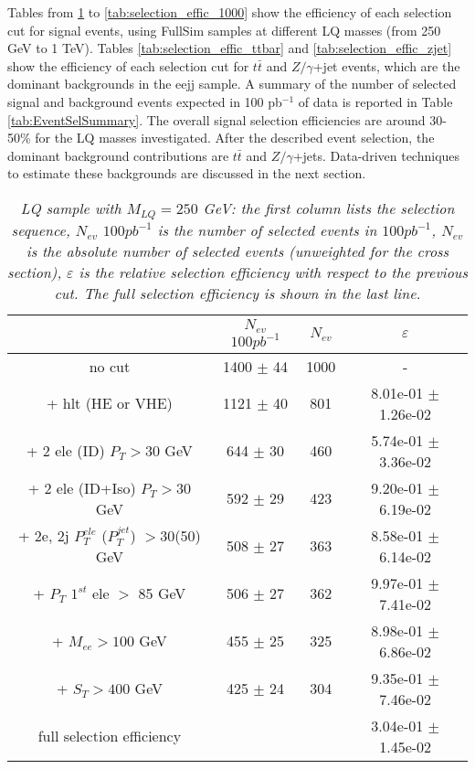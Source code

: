 \documentclass[colclass=cmspaper]{combine}
\begin{document}
\begin{linenumbers}
Tables from \ref{tab:selection_effic_250} to \ref{tab:selection_effic_1000} show the efficiency 
of each selection cut for signal events, using FullSim samples at different LQ masses (from 250 GeV to 1 TeV).
Tables \ref{tab:selection_effic_ttbar} and \ref{tab:selection_effic_zjet} show the efficiency of each selection cut 
for $t\bar{t}$ and $Z/\gamma$+jet events, which are the dominant backgrounds in the eejj sample. 
A summary of the number of selected signal and background events expected in 100 pb$^{-1}$ of data 
is reported in Table \ref{tab:EventSelSummary}. 
The overall signal selection efficiencies are around 30-50\% for the LQ masses investigated. 
After the described event selection, the dominant background contributions 
are $t\bar{t}$ and $Z/\gamma$+jets. Data-driven techniques to estimate these backgrounds
are discussed in the next section.


\begin{table}[htbp]
\begin{center}
\begin{tabular}{|c|c|c|c|}
\hline
\hline
 & $N_{ev}$ $100pb^{-1}$ & $N_{ev}$ & $\varepsilon$ \\
\hline
\hline

no cut &1400 $\pm$ 44& 1000 & - \\
+ hlt (HE or VHE) &1121 $\pm$ 40 & 801 & 8.01e-01 $\pm$ 1.26e-02\\
+ 2 ele (ID) $P_{T} >30$ GeV &644 $\pm$ 30 & 460 & 5.74e-01 $\pm$ 3.36e-02\\
+ 2 ele (ID+Iso) $P_{T} >30$ GeV &592 $\pm$ 29 & 423 & 9.20e-01 $\pm$ 6.19e-02\\
+ 2e, 2j $P_{T}^{ele}$ ($P_{T}^{jet}$) $>$30(50) GeV &508 $\pm$ 27& 363 & 8.58e-01 $\pm$ 6.14e-02\\
+ $P_{T}$ $1^{st}$ ele $>$ 85 GeV &506 $\pm$ 27& 362 & 9.97e-01 $\pm$ 7.41e-02\\
+ $M_{ee} >100$ GeV& 455 $\pm$ 25& 325 & 8.98e-01 $\pm$ 6.86e-02\\
+ $S_{T} >400$ GeV &425 $\pm$ 24& 304 & 9.35e-01 $\pm$ 7.46e-02\\
\hline

full selection efficiency& &  & 3.04e-01 $\pm$ 1.45e-02\\
\hline
\end{tabular}
\end{center}
\caption{\small \sl LQ sample with $M_{LQ}=250$ GeV: the first column lists the selection sequence, $N_{ev}$ $100pb^{-1}$ is the number of selected events in $100pb^{-1}$, $N_{ev}$ is the absolute number of selected events (unweighted for the cross section), $\varepsilon$ is the relative selection efficiency with respect to the previous cut. The full selection efficiency is shown in the last line.}
\label{tab:selection_effic_250}
\end{table}


\end{linenumbers}
\end{document}
